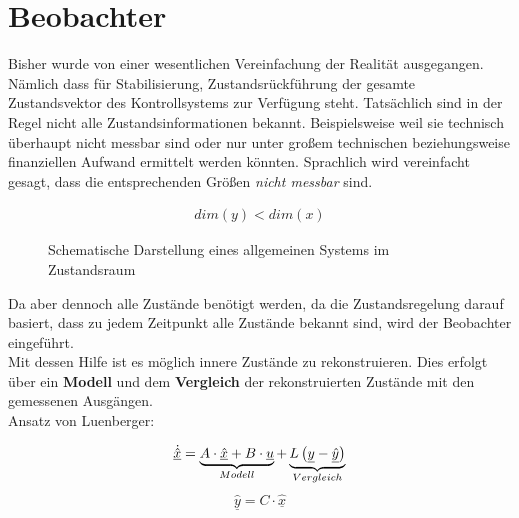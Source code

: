 \section{Beobachter}

Bisher wurde von einer wesentlichen Vereinfachung der Realität ausgegangen. Nämlich dass für Stabilisierung, Zustandsrückführung \etc der gesamte Zustandsvektor des Kontrollsystems zur Verfügung steht. Tatsächlich sind in der Regel nicht alle Zustandsinformationen bekannt. Beispielsweise weil sie technisch überhaupt nicht messbar sind oder nur unter großem technischen beziehungsweise finanziellen Aufwand ermittelt werden könnten. Sprachlich wird
vereinfacht gesagt, dass die entsprechenden Größen \textit{nicht messbar} sind.

\begin{align*}
    dim(y) < dim(x)
\end{align*}

\begin{figure}[H]
    \centering
    \caption[Allgemeines System im Zustandsraum]{Schematische Darstellung eines allgemeinen Systems im Zustandsraum}
    \label{fig:Bild43}
\end{figure}

Da aber dennoch alle Zustände benötigt werden, da die Zustandsregelung darauf basiert, dass zu jedem Zeitpunkt alle Zustände bekannt sind, wird der Beobachter eingeführt.\\
Mit dessen Hilfe ist es möglich innere Zustände zu rekonstruieren. Dies erfolgt über ein \textbf{Modell} und dem \textbf{Vergleich} der rekonstruierten Zustände mit den gemessenen Ausgängen.\\
\newline
Ansatz von Luenberger:


\[
    \underline{\dot{\hat{x}}} = 
    \underbrace{%
        A \cdot \underline{\hat{x}} + B \cdot \underline{u}
    }_{%
    Modell
    }
    + 
    \underbrace{%
    L \left( \underline{y} - \underline{\hat{y}}\right)
    }_{%
    Vergleich
    }
\]
\[
    \underline{\hat{y}} = C \cdot \underline{\hat{x}}
\]

